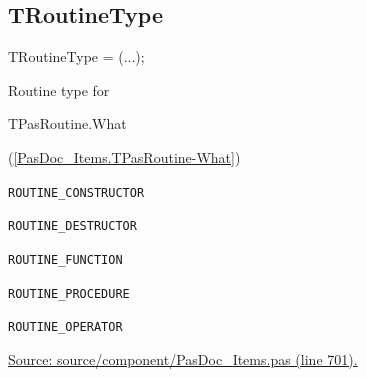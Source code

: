 \documentclass{report}
\newif\ifpdf
\begin{document}
\subsection*{TRoutineType}
\fi
\label{PasDoc_Items-TRoutineType}
\begin{list}{}{
\setlength{\itemindent}{0cm}
\setlength{\listparindent}{0cm}
\setlength{\leftmargin}{\evensidemargin}
\addtolength{\leftmargin}{\tmplength}
\settowidth{\labelsep}{X}
\addtolength{\leftmargin}{\labelsep}
\setlength{\labelwidth}{\tmplength}
}
\item[\textbf{Declaration}\hfill]
\ifpdf
\begin{flushleft}
\fi
\begin{ttfamily}
TRoutineType = (...);\end{ttfamily}

\ifpdf
\end{flushleft}
\fi

\par
\item[\textbf{Description}]
Routine type for \begin{ttfamily}TPasRoutine.What\end{ttfamily}(\ref{PasDoc_Items.TPasRoutine-What})\item[\textbf{Values}]
\begin{description}
\item[\texttt{ROUTINE{\_}CONSTRUCTOR}] \label{PasDoc_Items-ROUTINE_CONSTRUCTOR}
\index{}
 
\item[\texttt{ROUTINE{\_}DESTRUCTOR}] \label{PasDoc_Items-ROUTINE_DESTRUCTOR}
\index{}
 
\item[\texttt{ROUTINE{\_}FUNCTION}] \label{PasDoc_Items-ROUTINE_FUNCTION}
\index{}
 
\item[\texttt{ROUTINE{\_}PROCEDURE}] \label{PasDoc_Items-ROUTINE_PROCEDURE}
\index{}
 
\item[\texttt{ROUTINE{\_}OPERATOR}] \label{PasDoc_Items-ROUTINE_OPERATOR}
\index{}
 
\end{description}
\par
\href{https://github.com/pasdoc/pasdoc/blob/master/source/component/PasDoc_Items.pas#L701}{Source: source/component/PasDoc{\_}Items.pas (line 701).}

\end{list}
\ifpdf
\end{document}
